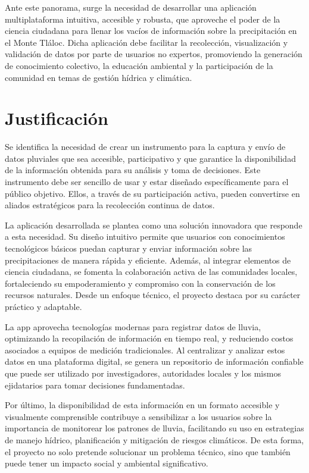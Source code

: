 Ante este panorama, surge la necesidad de desarrollar una aplicación multiplataforma intuitiva, accesible y robusta, que aproveche el poder de la ciencia ciudadana para llenar los vacíos de información sobre la precipitación en el Monte Tláloc. Dicha aplicación debe facilitar la recolección, visualización y validación de datos por parte de usuarios no expertos, promoviendo la generación de conocimiento colectivo, la educación ambiental y la participación de la comunidad en temas de gestión hídrica y climática.


\section{Justificación}
Se identifica la necesidad de crear un instrumento para la captura y envío de datos pluviales que sea accesible, participativo y que garantice la disponibilidad de la información obtenida para su análisis y toma de decisiones. Este instrumento debe ser sencillo de usar y estar diseñado específicamente para el público objetivo. Ellos, a través de su participación activa, pueden convertirse en aliados estratégicos para la recolección continua de datos.

La aplicación desarrollada se plantea como una solución innovadora que responde a esta necesidad. Su diseño intuitivo permite que usuarios con conocimientos tecnológicos básicos puedan capturar y enviar información sobre las precipitaciones de manera rápida y eficiente. Además, al integrar elementos de ciencia ciudadana, se fomenta la colaboración activa de las comunidades locales, fortaleciendo su empoderamiento y compromiso con la conservación de los recursos naturales. Desde un enfoque técnico, el proyecto destaca por su carácter práctico y adaptable.

La app aprovecha tecnologías modernas para registrar datos de lluvia, optimizando la recopilación de información en tiempo real, y reduciendo costos asociados a equipos de medición tradicionales. Al centralizar y analizar estos datos en una plataforma digital, se genera un repositorio de información confiable que puede ser utilizado por investigadores, autoridades locales y los mismos ejidatarios para tomar
decisiones fundamentadas.

Por último, la disponibilidad de esta información en un formato accesible y visualmente comprensible contribuye a sensibilizar a los usuarios sobre la importancia de monitorear los patrones de lluvia, facilitando su uso en estrategias de manejo hídrico, planificación y mitigación de riesgos climáticos. De esta forma, el proyecto no solo pretende solucionar un problema técnico, sino que también puede tener un impacto social y ambiental significativo.



